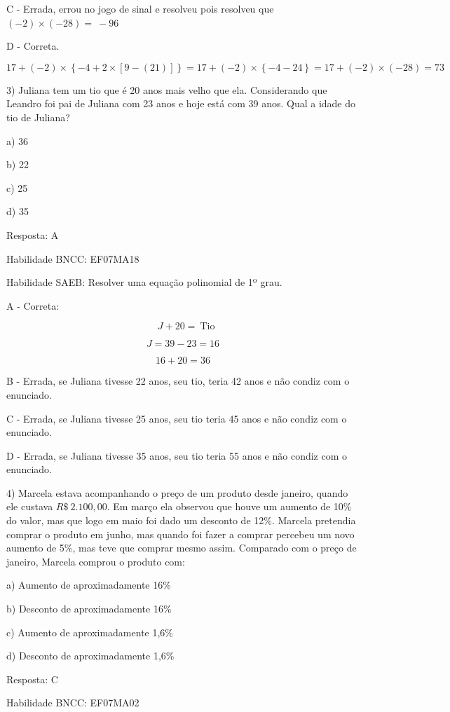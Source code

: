 {C - Errada, errou no jogo de sinal e resolveu pois resolveu que
\(( - 2) \times \left( - 28 \right) = \  - 96\)

D - Correta.

\[17 + ( - 2) \times \left\{ - 4 + 2 \times \left\lbrack 9 - \left( 21 \right) \right\rbrack \right\} = 17 + ( - 2) \times \left\{ - 4 - 24 \right\} = 17 + ( - 2) \times \left( - 28 \right) = 73\]

3) Juliana tem um tio que é 20 anos mais velho que ela. Considerando que
Leandro foi pai de Juliana com 23 anos e hoje está com 39 anos. Qual a
idade do tio de Juliana?

a) 36

b) 22

c) 25

d) 35

Resposta: A

Habilidade BNCC: EF07MA18

Habilidade SAEB: Resolver uma equação polinomial de 1º grau.

A - Correta:

\[\text{\ \ \ \ \ \ \ }J + 20 = \ \text{Tio}\]

\[J = 39 - 23 = 16\]

\[16 + 20 = 36\]

B - Errada, se Juliana tivesse 22 anos, seu tio, teria 42 anos e não
condiz com o enunciado.

C - Errada, se Juliana tivesse 25 anos, seu tio teria 45 anos e não
condiz com o enunciado.

D - Errada, se Juliana tivesse 35 anos, seu tio teria 55 anos e não
condiz com o enunciado.

4) Marcela estava acompanhando o preço de um produto desde janeiro,
quando ele custava \(R\$\ 2.100,00\). Em março ela observou que houve um
aumento de 10\% do valor, mas que logo em maio foi dado um desconto de
12\%. Marcela pretendia comprar o produto em junho, mas quando foi fazer
a comprar percebeu um novo aumento de 5\%, mas teve que comprar mesmo
assim. Comparado com o preço de janeiro, Marcela comprou o produto com:

a) Aumento de aproximadamente 16\%

b) Desconto de aproximadamente 16\%

c) Aumento de aproximadamente 1,6\%

d) Desconto de aproximadamente 1,6\%

Resposta: C

Habilidade BNCC: EF07MA02

}
